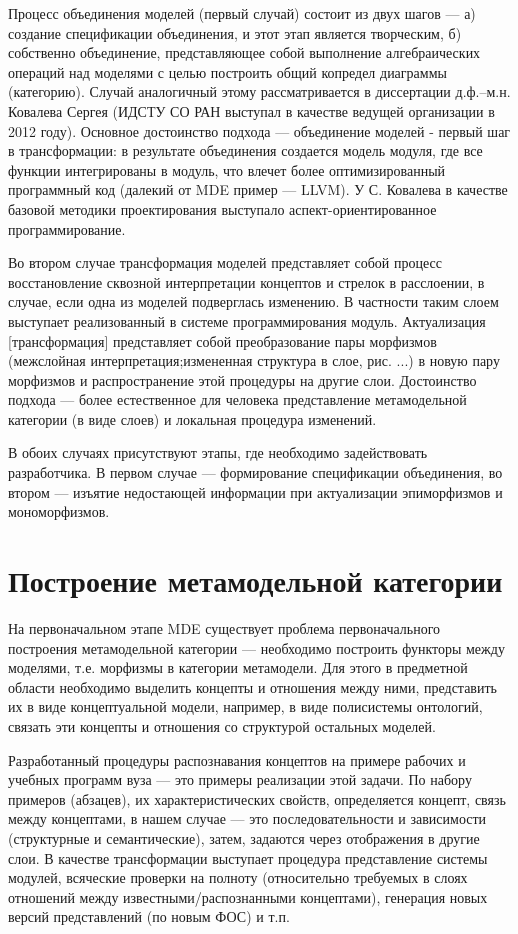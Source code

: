 \documentclass[12pt,a4paper]{extarticle}
\begin{document}
Процесс объединения моделей (первый случай) состоит из двух шагов --- а) создание
спецификации объединения, и этот этап является творческим, б) собственно
объединение, представляющее собой выполнение алгебраических операций над
моделями с целью построить общий копредел диаграммы (категорию).  Случай
аналогичный этому рассматривается в диссертации д.ф.--м.н. Ковалева Сергея
(ИДСТУ СО РАН выступал в качестве ведущей организации в 2012 году).  Основное
достоинство подхода --- объединение моделей - первый шаг в трансформации: в
результате объединения создается модель модуля, где все функции интегрированы в
модуль, что влечет более оптимизированный программный код (далекий от MDE пример
--- LLVM).  У С. Ковалева в качестве базовой методики проектирования выступало
аспект-ориентированное программирование.

Во втором случае трансформация моделей представляет собой процесс восстановление
сквозной интерпретации концептов и стрелок в расслоении, в случае, если одна из
моделей подверглась изменению.  В частности таким слоем выступает реализованный
в системе программирования модуль.  Актуализация [трансформация] представляет
собой преобразование пары морфизмов (межслойная интерпретация;измененная
структура в слое, рис. ...) в новую пару морфизмов и распространение этой
процедуры на другие слои.  Достоинство подхода --- более естественное для
человека представление метамодельной категории (в виде слоев) и локальная
процедура изменений.

В обоих случаях присутствуют этапы, где необходимо задействовать разработчика.
В первом случае --- формирование спецификации объединения, во втором --- изъятие
недостающей информации при актуализации эпиморфизмов и мономорфизмов.

\section{Построение метамодельной категории}
\label{sec:mmod-construction}

На первоначальном этапе MDE существует проблема первоначального построения
метамодельной категории --- необходимо построить функторы между моделями, т.е.
морфизмы в категории метамодели.  Для этого в предметной области необходимо
выделить концепты и отношения между ними, представить их в виде концептуальной
модели, например, в виде полисистемы онтологий, связать эти концепты и отношения
со структурой остальных моделей.

Разработанный процедуры распознавания концептов на примере рабочих и учебных
программ вуза --- это примеры реализации этой задачи.  По набору примеров
(абзацев), их характеристических свойств, определяется концепт, связь между
концептами, в нашем случае --- это последовательности и зависимости (структурные
и семантические), затем, задаются через отображения в другие слои.  В качестве
трансформации выступает процедура представление системы модулей, всяческие
проверки на полноту (относительно требуемых в слоях отношений между
известными/распознанными концептами), генерация новых версий представлений (по
новым ФОС) и т.п.
\end{document}
